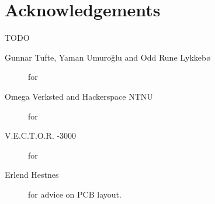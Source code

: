 \chapter*{Acknowledgements}

TODO

\begin{description}
\item[Gunnar Tufte, Yaman Umuroğlu and Odd Rune Lykkebø] for 

\item[Omega Verksted and Hackerspace NTNU] for

\item[V.E.C.T.O.R. -3000] for

\item[Erlend Hestnes] for advice on PCB layout.
\end{description}
